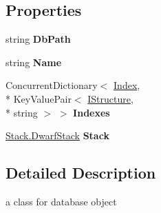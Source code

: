 \subsection*{Properties}
\begin{DoxyCompactItemize}
\item 
\hypertarget{class_dwarf_d_b_1_1_data_structures_1_1_data_base_a6d2cec1036e84cf7bd32e14cb57fb2c9}{string {\bfseries Db\+Path}}\label{class_dwarf_d_b_1_1_data_structures_1_1_data_base_a6d2cec1036e84cf7bd32e14cb57fb2c9}

\item 
\hypertarget{class_dwarf_d_b_1_1_data_structures_1_1_data_base_ab8b85389f822faa790eaf18a7fe35cce}{string {\bfseries Name}}\label{class_dwarf_d_b_1_1_data_structures_1_1_data_base_ab8b85389f822faa790eaf18a7fe35cce}

\item 
\hypertarget{class_dwarf_d_b_1_1_data_structures_1_1_data_base_ae5d3a3199e83d89ec2915a788721f96c}{Concurrent\+Dictionary$<$ \hyperlink{class_dwarf_d_b_1_1_data_structures_1_1_index}{Index}, \\*
Key\+Value\+Pair$<$ \hyperlink{interface_dwarf_d_b_1_1_data_structures_1_1_i_structure}{I\+Structure}, \\*
string $>$ $>$ {\bfseries Indexes}}\label{class_dwarf_d_b_1_1_data_structures_1_1_data_base_ae5d3a3199e83d89ec2915a788721f96c}

\item 
\hypertarget{class_dwarf_d_b_1_1_data_structures_1_1_data_base_a2ca4a32633cc1324190d6f37da17cc8b}{\hyperlink{class_dwarf_d_b_1_1_stack_1_1_dwarf_stack}{Stack.\+Dwarf\+Stack} {\bfseries Stack}}\label{class_dwarf_d_b_1_1_data_structures_1_1_data_base_a2ca4a32633cc1324190d6f37da17cc8b}

\end{DoxyCompactItemize}


\subsection{Detailed Description}
a class for database object 



